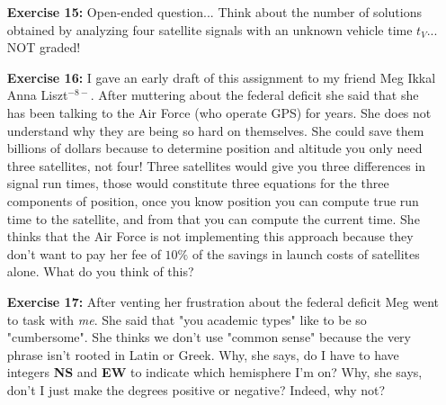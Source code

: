 \documentclass[11pt]{article}
\theoremstyle{definition}
\newcommand{\1}[1]{\mathbf{1} \left \{ #1 \right \}}
\begin{document}
\begin{itemize}
\item[{\textbf{Exercise 15:}}] Open-ended question... Think about the number of solutions obtained by analyzing four satellite signals with an unknown vehicle time $t_V$... NOT graded!
\end{itemize}

\begin{itemize}
\item[{\textbf{Exercise 16:}}] I gave an early draft of this assignment to my friend Meg Ikkal Anna Liszt$^{-8-}$.  After muttering about the federal deficit she said that she has been talking to the Air Force (who operate GPS) for years.  She does not understand why they are being so hard on themselves.  She could save them billions of dollars because to determine position and altitude you only need three satellites, not four!  Three satellites would give you three differences in signal run times, those would constitute three equations for the three components of position, once you know position you can compute true run time to the satellite, and from that you can compute the current time.  She thinks that the Air Force is not implementing this approach because they don't want to pay her fee of $10\%$ of the savings in launch costs of satellites alone.  What do you think of this?
\end{itemize}

\begin{itemize}
\item[{\textbf{Exercise 17:}}] After venting her frustration about the federal deficit Meg went to task with \textit{me}.  She said that "you academic types" like to be so "cumbersome".  She thinks we don't use "common sense" because the very phrase isn't rooted in Latin or Greek.  Why, she says, do I have to have integers \textbf{NS} and \textbf{EW} to indicate which hemisphere I'm on?  Why, she says, don't I just make the degrees positive or negative?  Indeed, why not?
\end{itemize}
\end{document}
